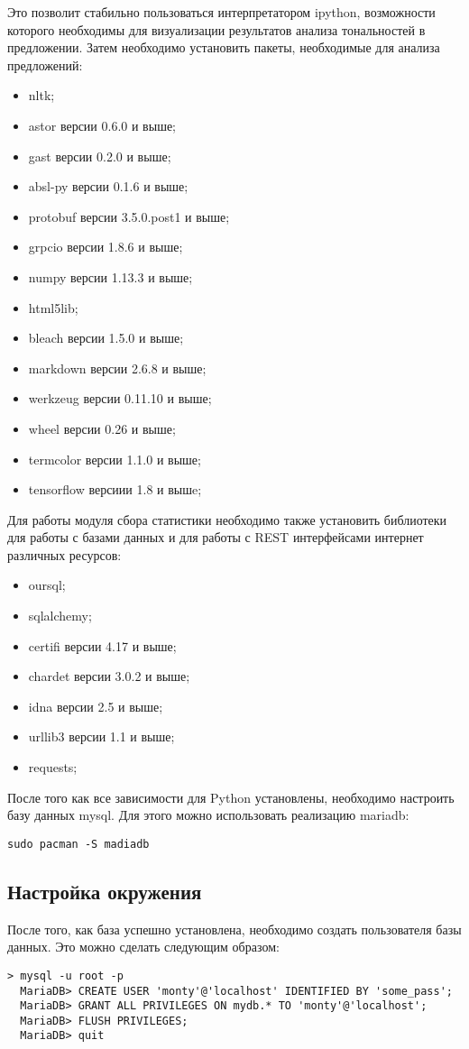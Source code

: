 Это позволит стабильно пользоваться интерпретатором ipython, возможности которого необходимы для визуализации результатов анализа тональностей в предложении. Затем необходимо установить пакеты, необходимые для анализа предложений:
\begin{itemize}
\item nltk;
\item astor версии 0.6.0 и выше;
\item gast версии 0.2.0 и выше;
\item absl-py версии 0.1.6 и выше;
\item protobuf версии 3.5.0.post1 и выше;
\item grpcio версии 1.8.6 и выше;
\item numpy версии 1.13.3 и выше;
\item html5lib;
\item bleach версии 1.5.0 и выше;
\item markdown версии 2.6.8 и выше;
\item werkzeug версии 0.11.10 и выше;
\item wheel версии 0.26 и выше;
\item termcolor версии 1.1.0 и выше;
\item tensorflow версиии 1.8 и вышe;
\end{itemize}

Для работы модуля сбора статистики необходимо также установить библиотеки для работы с базами данных и для работы с REST интерфейсами интернет различных ресурсов:
\begin{itemize}
\item oursql;
\item sqlalchemy;
\item certifi версии 4.17 и выше;
\item chardet версии 3.0.2 и выше;
\item idna версии 2.5 и выше;
\item urllib3 версии 1.1 и выше;
\item requests;
\end{itemize}

После того как все зависимости для Python установлены, необходимо настроить базу данных mysql. Для этого можно использовать реализацию mariadb:
\medskip
\begin{lstlisting}[style=Python]
  sudo pacman -S madiadb
\end{lstlisting}
\medskip

\subsection{Настройка окружения}
После того, как база успешно установлена, необходимо создать пользователя базы данных. Это можно сделать следующим образом:
\medskip
\begin{lstlisting}[style=Python]
  > mysql -u root -p
  MariaDB> CREATE USER 'monty'@'localhost' IDENTIFIED BY 'some_pass';
  MariaDB> GRANT ALL PRIVILEGES ON mydb.* TO 'monty'@'localhost';
  MariaDB> FLUSH PRIVILEGES;
  MariaDB> quit
\end{lstlisting}
\medskip

